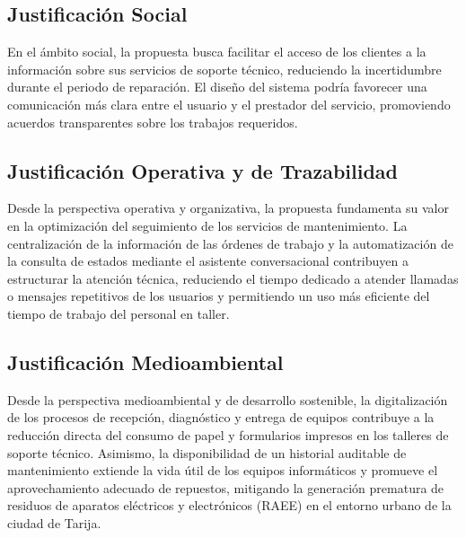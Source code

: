 \subsection{Justificación Social}

En el ámbito social, la propuesta busca facilitar el acceso de los clientes a la información sobre sus servicios de soporte técnico, reduciendo la incertidumbre durante el periodo de reparación. El diseño del sistema podría favorecer una comunicación más clara entre el usuario y el prestador del servicio, promoviendo acuerdos transparentes sobre los trabajos requeridos.

\subsection{Justificación Operativa y de Trazabilidad}

Desde la perspectiva operativa y organizativa, la propuesta fundamenta su valor en la optimización del seguimiento de los servicios de mantenimiento. La centralización de la información de las órdenes de trabajo y la automatización de la consulta de estados mediante el asistente conversacional contribuyen a estructurar la atención técnica, reduciendo el tiempo dedicado a atender llamadas o mensajes repetitivos de los usuarios y permitiendo un uso más eficiente del tiempo de trabajo del personal en taller.

\subsection{Justificación Medioambiental}

Desde la perspectiva medioambiental y de desarrollo sostenible, la digitalización de los procesos de recepción, diagnóstico y entrega de equipos contribuye a la reducción directa del consumo de papel y formularios impresos en los talleres de soporte técnico. Asimismo, la disponibilidad de un historial auditable de mantenimiento extiende la vida útil de los equipos informáticos y promueve el aprovechamiento adecuado de repuestos, mitigando la generación prematura de residuos de aparatos eléctricos y electrónicos (RAEE) en el entorno urbano de la ciudad de Tarija.